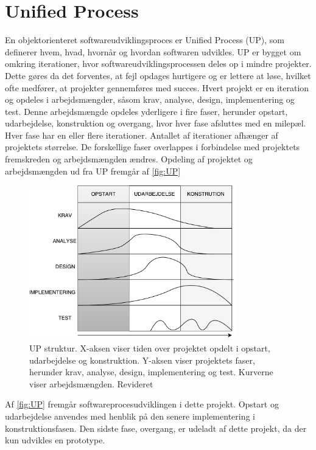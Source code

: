 \section{Unified Process} \label{sec:UP}
En objektorienteret softwareudviklingsproces er Unified Process (UP), som definerer hvem, hvad, hvornår og hvordan softwaren udvikles. UP er bygget om omkring iterationer, hvor softwareudviklingsprocessen deles op i mindre projekter. Dette gøres da det forventes, at fejl opdages hurtigere og er lettere at løse, hvilket ofte medfører, at projekter gennemføres med succes. Hvert projekt er en iteration og opdeles i arbejdsmængder, såsom krav, analyse, design, implementering og test. Denne arbejdsmængde opdeles yderligere i fire faser, herunder opstart, udarbejdelse, konstruktion og overgang, hvor hver fase afsluttes med en milepæl. Hver fase har en eller flere iterationer. Antallet af iterationer afhænger af projektets størrelse. De forskellige faser overlappes i forbindelse med projektets fremskreden og arbejdsmængden ændres.\cite{Arlow2002} Opdeling af projektet og arbejdsmængden ud fra UP fremgår af \autoref{fig:UP}

\begin{figure} [H]
\centering
\includegraphics[width=0.8\textwidth]{figures/UP}
\caption{UP struktur. X-aksen viser tiden over projektet opdelt i opstart, udarbejdelse og konstruktion. Y-aksen viser projektets faser, herunder krav, analyse, design, implementering og test. Kurverne viser arbejdsmængden. Revideret \cite{Arlow2002}}
\label{fig:UP}
\end{figure} 

\noindent
Af \autoref{fig:UP} fremgår softwareprocesudviklingen i dette projekt. Opstart og udarbejdelse anvendes med henblik på den senere implementering i konstruktionsfasen. Den sidste fase, overgang, er udeladt af dette projekt, da der kun udvikles en prototype. 

